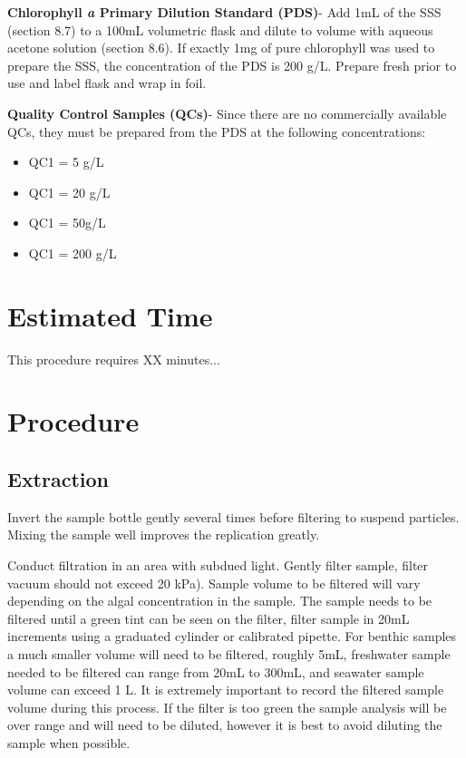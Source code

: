 \documentclass[12pt]{../SOP3_alpha}
\begin{document}
\NP \textbf{Chlorophyll \textit{a} Primary Dilution Standard (PDS)}- Add 1mL of the SSS (section 8.7) to a 100mL volumetric flask and dilute to volume with aqueous acetone solution (section 8.6). If exactly 1mg of pure chlorophyll was used to prepare the SSS, the concentration of the PDS is 200 \micro g/L. Prepare fresh prior to use and label flask and wrap in foil.

\NP \textbf{Quality Control Samples (QCs)}- Since there are no commercially available QCs, they must be prepared from the PDS at the following concentrations:
\begin{itemize}
\item QC1 = 5 \micro g/L
\item QC1 = 20 \micro g/L
\item QC1 = 50\micro g/L
\item QC1 = 200 \micro g/L
\end{itemize}

\section{Estimated Time}

\NP This procedure requires XX minutes...

\section{Procedure} 


\subsection*{Extraction}
\NP Invert the sample bottle gently several times before filtering to suspend particles. Mixing the sample well improves the replication greatly.

\NP Conduct filtration in an area with subdued light. Gently filter sample, filter vacuum should not exceed 20 kPa). Sample volume to be filtered will vary depending on the algal concentration in the sample. The sample needs to be filtered until a green tint can be seen on the filter, filter sample in 20mL increments using a graduated cylinder or calibrated pipette. For benthic samples a much smaller volume will need to be filtered, roughly 5mL, freshwater sample needed to be filtered can range from 20mL to 300mL, and seawater sample volume can exceed 1 L. It is extremely important to record the filtered sample volume during this process. If the filter is too green the sample analysis will be over range and will need to be diluted, however it is best to avoid diluting the sample when possible. 
\end{document}
